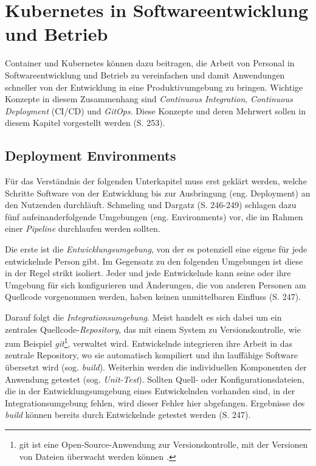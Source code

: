 \documentclass[11pt,a4paper]{article}
\begin{document}
\section{Kubernetes in Softwareentwicklung und Betrieb}
\label{sec:devops}
Container und Kubernetes können dazu beitragen, die Arbeit von Personal in Softwareentwicklung und
Betrieb zu vereinfachen und damit Anwendungen schneller von der Entwicklung
in eine Produktivumgebung zu bringen.
Wichtige Konzepte in diesem Zusammenhang sind
\emph{Continuous Integration}, \emph{Continuous Deployment} (CI/CD)
und \emph{GitOps}. Diese Konzepte und deren Mehrwert sollen in diesem Kapitel vorgestellt werden \cite{domingus2022cloud} (S. 253).

\subsection{Deployment Environments}
Für das Verständnis der folgenden Unterkapitel muss erst geklärt werden,
welche Schritte Software von der Entwicklung bis zur Ausbringung (eng. Deployment) an den
Nutzenden durchläuft.
Schmeling und Dargatz \cite{Schmeling_Dargatz_2022} (S. 246-249) schlagen dazu
fünf aufeinanderfolgende Umgebungen (eng. Environments) vor, die im Rahmen
einer \emph{Pipeline} durchlaufen werden sollten.

Die erste ist die \emph{Entwicklungsumgebung}, von der es potenziell
eine eigene für jede entwickelnde Person gibt. Im Gegensatz zu den folgenden
Umgebungen ist diese in der Regel strikt isoliert. Jeder und jede Entwickelnde
kann seine oder ihre Umgebung für sich konfigurieren und Änderungen, die von anderen
Personen am Quellcode vorgenommen werden, haben keinen unmittelbaren Einfluss \cite{Schmeling_Dargatz_2022} (S. 247).

Darauf folgt die \emph{Integrationsumgebung}. Meist handelt es sich dabei
um ein zentrales Quellcode-\emph{Repository}, das mit einem System zu Versionskontrolle, wie zum Beispiel
\emph{git}\footnote{git ist eine Open-Source-Anwendung zur Versionskontrolle, mit der Versionen von Dateien überwacht werden können \cite{chacon2014pro}.}, verwaltet wird.
Entwickelnde integrieren ihre Arbeit in das zentrale Repository, wo sie
automatisch kompiliert und ihn lauffähige Software übersetzt wird (sog. \emph{build}).
Weiterhin werden die individuellen Komponenten der Anwendung getestet (sog. \emph{Unit-Test}).
Sollten Quell- oder Konfigurationsdateien, die in der Entwicklungsumgebung
eines Entwickelnden vorhanden sind, in der Integrationsumgebung fehlen,
wird dieser Fehler hier abgefangen.
Ergebnisse des \emph{build} können bereits durch Entwickelnde getestet werden \cite{Schmeling_Dargatz_2022} (S. 247).
\end{document}
